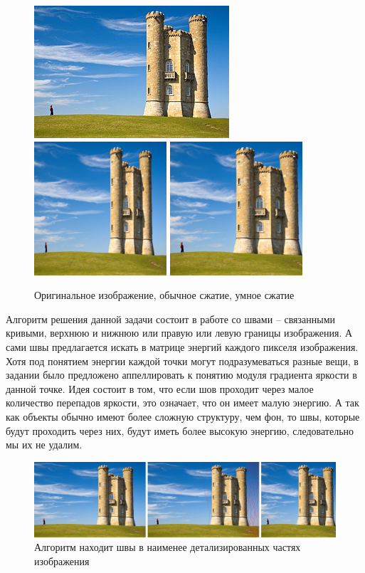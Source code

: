 \documentclass[a4paper, 12pt]{article}
\begin{document}
\begin{figure}[h]
	\centering
	\includegraphics[scale=2]{sc1.jpg}
	\includegraphics[scale=0.6]{sc2.png}
	\includegraphics[scale=0.6]{sc3.png}
	\caption{Оригинальное изображение, обычное сжатие, умное сжатие}
\end{figure}

Алгоритм решения данной задачи состоит в работе со швами -- связанными кривыми, верхнюю и нижнюю или правую или левую границы изображения. А сами швы предлагается искать в матрице энергий каждого пикселя изображения. Хотя под понятием энергии каждой точки могут подразумеваться разные вещи, в задании было предложено аппеллировать к понятию модуля градиента яркости в данной точке. Идея состоит в том, что 
если шов проходит через малое количество перепадов яркости, это означает, что он имеет малую
энергию. А так как объекты обычно имеют более сложную структуру, чем фон, то швы,
которые будут проходить через них, будут иметь более высокую энергию, следовательно мы их не
удалим.

\begin{figure}[h]
	\centering
	\includegraphics[scale=0.2]{resize_diff.jpeg}
	\caption{Алгоритм находит швы в наименее детализированных частях изображения}
\end{figure}
\end{document}
